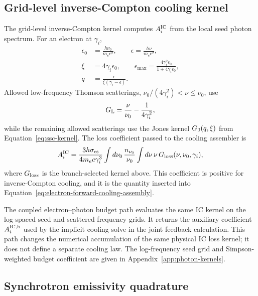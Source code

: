 \documentclass[twocolumn]{aastex702}
\begin{document}
\subsection{Grid-level inverse-Compton cooling kernel}

The grid-level inverse-Compton kernel computes \(A_i^{\rm IC}\) from the local
seed photon spectrum.  For an electron at \(\gamma_i\),
\begin{equation}
\begin{aligned}
\epsilon_0&=\frac{h\nu_0}{m_e c^2},\qquad
\epsilon=\frac{h\nu}{m_e c^2},\\
\xi&=4\gamma_i\epsilon_0,\qquad
\epsilon_{\max}=\frac{4\gamma_i^2\epsilon_0}
{1+4\gamma_i\epsilon_0},\\
q&=\frac{\epsilon}{\xi(\gamma_i-\epsilon)} .
\end{aligned}
\end{equation}
Allowed low-frequency Thomson scatterings,
\(\nu_0/(4\gamma_i^2)<\nu\le\nu_0\), use
\begin{equation}
G_{\rm L}=\frac{\nu}{\nu_0}-\frac{1}{4\gamma_i^2},
\end{equation}
while the remaining allowed scatterings use the Jones kernel
\(G_{\rm J}(q,\xi)\) from Equation~\eqref{eq:ssc-kernel}.  The loss coefficient
passed to the cooling assembler is
\begin{equation}
A_i^{\rm IC}=
\frac{3h\sigma_{\rm es}}{4m_e c\gamma_i^3}
\int d\nu_0\,\frac{n_{\nu_0}}{\nu_0}
\int d\nu\,\nu\,G_{\rm loss}(\nu,\nu_0,\gamma_i),
\end{equation}
where \(G_{\rm loss}\) is the branch-selected kernel above.  This coefficient is
positive for inverse-Compton cooling, and it is the quantity inserted into
Equation~\eqref{eq:electron-forward-cooling-assembly}.

The coupled electron--photon budget path evaluates the same IC kernel on the
log-spaced seed and scattered-frequency grids.  It returns the auxiliary
coefficient \(A_i^{\rm IC,b}\) used by the implicit cooling solve in the joint
feedback calculation.  This path changes the numerical accumulation of the same
physical IC loss kernel; it does not define a separate cooling law.  The
log-frequency seed grid and Simpson-weighted budget coefficient are given in
Appendix~\ref{app:photon-kernels}.

\subsection{Synchrotron emissivity quadrature}
\end{document}
